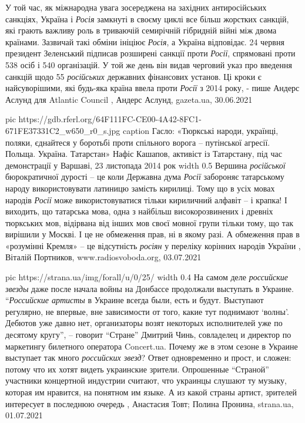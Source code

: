 У той час, як міжнародна увага зосереджена на західних антиросійських санкціях,
Україна і \emph{Росія} замкнуті в своєму циклі все більш жорстких санкцій, які грають
важливу роль в триваючій семирічній гібридній війні між двома країнами.
Зазвичай такі обміни ініціює \emph{Росія}, а Україна відповідає.  24 червня президент
Зеленський підписав розширені санкції проти \emph{Росії}, спрямовані проти 538 осіб і
540 організацій. У той же день він видав черговий указ про введення санкцій
щодо 55 \emph{російських} державних фінансових установ. Ці кроки є найсуворішими, які
будь-яка країна ввела проти \emph{Росії} з 2014 року, - пише Андерс Аслунд для
Atlantic Council
, 
Андерс Аслунд, gazeta.ua, 30.06.2021

\ifcmt
  pic https://gdb.rferl.org/64F111FC-CE00-4A42-8FC1-671FE37331C2_w650_r0_s.jpg
	caption Гасло: «Тюркські народи, українці, поляки, єднайтеся у боротьбі проти спільного ворога – путінської агресії. Польща. Україна. Татарстан» Нафіс Кашапов, активіст із Татарстану, під час демонстрації у Варшаві, 23 листопада 2014 рок
	width 0.5
\fi
Вершина \emph{російської} бюрократичної дурості – це коли Державна дума \emph{Росії}
забороняє татарському народу використовувати латиницю замість кирилиці. Тому що
в усіх мовах народів \emph{Росії} може використовуватися тільки кириличний алфавіт – і
крапка! І виходить, що татарська мова, одна з найбільш високорозвинених і
древніх тюркських мов, відірвана від інших мов своєї мовної групи тільки тому,
що так вирішили у Москві. І це не обмеження прав, ні в якому разі. А обмеження
прав в «розумінні Кремля» – це відсутність \emph{росіян} у переліку корінних народів
України
, 
Віталій Портников, www.radiosvoboda.org, 03.07.2021

\ifcmt
  pic https://strana.ua/img/forall/u/0/25/%
  width 0.4
\fi
На самом деле \emph{российские звезды} даже после начала войны на Донбассе
продолжали выступать в Украине.  \enquote{\emph{Российские артисты} в Украине
всегда были, есть и будут. Выступают регулярно, не впервые, вне зависимости от
того, какие тут поднимают \enquote{волны}. Дебютов уже давно нет, организаторы
возят некоторых исполнителей уже по десятому кругу}, – говорит \enquote{Стране}
Дмитрий Чинь, совладелец и директор по маркетингу билетного оператора
Concert.ua.  Почему же в этом сезоне в Украине выступает так много
\emph{российских звезд}?  Ответ одновременно и прост, и сложен: потому что их
хотят видеть украинские зрители.  Опрошенные \enquote{Страной} участники
концертной индустрии считают, что украинцы слушают ту музыку, которая им
нравится, на понятном им языке. А из какой страны артист, зрителей интересует в
последнюю очередь
, 
Анастасия Товт; Полина Пронина, strana.ua, 01.07.2021


